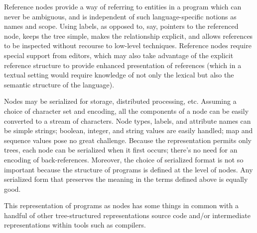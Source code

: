Reference nodes provide a way of referring to entities in a program which can never be ambiguous, and is independent of such language-specific notions as names and scope. Using labels, as opposed to, say, pointers to the referenced node, keeps the tree simple, makes the relationship explicit, and allows references to be inspected without recourse to low-level techniques. Reference nodes require special support from editors, which may also take advantage of the explicit reference structure to provide enhanced presentation of references (which in a textual setting would require knowledge of not only the lexical but also the semantic structure of the language).

Nodes may be serialized for storage, distributed processing, etc. Assuming a choice of character set and encoding, all the components of a node can be easily converted to a stream of characters. Node types, labels, and attribute names can be simple strings; boolean, integer, and string values are easily handled; map and sequence values pose no great challenge. Because the representation permits only trees, each node can be serialized when it first occurs; there's no need for an encoding of back-references. Moreover, the choice of serialized format is not so important because the structure of programs is defined at the level of nodes. Any serialized form that preserves the meaning in the terms defined above is equally good.

This representation of programs as nodes has some things in common with a handful of other tree-structured representations source code and/or intermediate representations within tools such as compilers.

